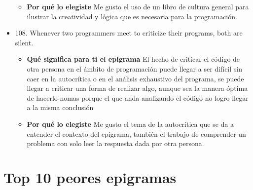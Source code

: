 \documentclass{article}
\begin{document}
\begin{itemize}
\begin{itemize}
                
            \item \textbf{ Por qué lo elegiste}
            \newline Me gusto el uso de un libro de cultura general para ilustrar la creatividad y lógica que es necesaria para la programación. 
        \end{itemize}
    \item 108. Whenever two programmers meet to criticize their programs, both are silent.\
            \begin{itemize}
            \item \textbf{ Qué significa para ti el epigrama} 
            \newline El hecho de criticar el código de otra persona en el ámbito de programación puede llegar a ser difícil sin caer en la autocrítica o en el análisis exhaustivo del programa, se puede llegar a criticar una forma de realizar algo, aunque sea la manera óptima de hacerlo nomas porque el que anda analizando el código no logro llegar a la misma conclusión
                
            
                
            \item \textbf{ Por qué lo elegiste}
                \newline Me gusto el tema de la autocrítica que se da a entender el contexto del epigrama, también el trabajo de comprender un problema con solo leer la respuesta dada por otra persona.

            
        \end{itemize}
\end{itemize}

\newpage

\section{Top 10 peores epigramas}
\end{document}
